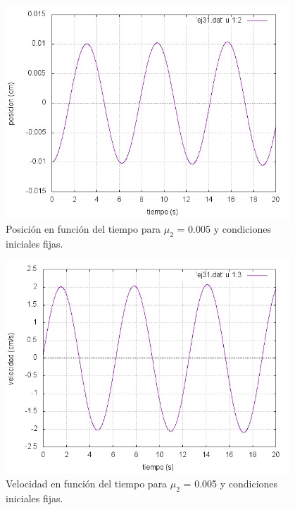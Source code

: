 \documentclass[a4paper,12pt]{article}
\begin{document}
\begin{itemize}
\begin{figure}[H]
\begin{center}
\includegraphics[height=8cm]{grafico_ej31_xVSt.jpg}
\caption[width=5cm]{Posici\'on en funci\'on del tiempo para $\mu_2$ = 0.005 y condiciones iniciales fijas.}
\end{center}
\end{figure}

\begin{figure}[H]
\begin{center}
\includegraphics[height=8cm]{grafico_ej31_vVSt.jpg}
\caption[width=5cm]{Velocidad en funci\'on del tiempo para $\mu_2$ = 0.005 y condiciones iniciales fijas.}
\end{center}
\end{figure}


\end{itemize}
\end{document}
